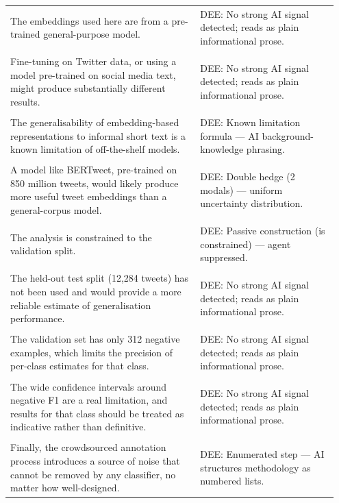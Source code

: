 \documentclass[11pt]{article}
\begin{document}
\begin{longtable}{|p{0.55\linewidth}|p{0.40\linewidth}|}
\hline
\rule{0pt}{3.5cm} & \\
\hline
The embeddings used here are from a pre-trained general-purpose model. & DEE: No strong AI signal detected; reads as plain informational prose. \\[2pt]
\hline
\rule{0pt}{3.5cm} & \\
\hline
Fine-tuning on Twitter data, or using a model pre-trained on social media text, might produce substantially different results. & DEE: No strong AI signal detected; reads as plain informational prose. \\[2pt]
\hline
\rule{0pt}{3.5cm} & \\
\hline
The generalisability of embedding-based representations to informal short text is a known limitation of off-the-shelf models. & DEE: Known limitation formula --- AI background-knowledge phrasing. \\[2pt]
\hline
\rule{0pt}{3.5cm} & \\
\hline
A model like BERTweet, pre-trained on 850 million tweets, would likely produce more useful tweet embeddings than a general-corpus model. & DEE: Double hedge (2 modals) --- uniform uncertainty distribution. \\[2pt]
\hline
\rule{0pt}{3.5cm} & \\
\hline
The analysis is constrained to the validation split. & DEE: Passive construction (is constrained) --- agent suppressed. \\[2pt]
\hline
\rule{0pt}{3.5cm} & \\
\hline
The held-out test split (12,284 tweets) has not been used and would provide a more reliable estimate of generalisation performance. & DEE: No strong AI signal detected; reads as plain informational prose. \\[2pt]
\hline
\rule{0pt}{3.5cm} & \\
\hline
The validation set has only 312 negative examples, which limits the precision of per-class estimates for that class. & DEE: No strong AI signal detected; reads as plain informational prose. \\[2pt]
\hline
\rule{0pt}{3.5cm} & \\
\hline
The wide confidence intervals around negative F1 are a real limitation, and results for that class should be treated as indicative rather than definitive. & DEE: No strong AI signal detected; reads as plain informational prose. \\[2pt]
\hline
\rule{0pt}{3.5cm} & \\
\hline
Finally, the crowdsourced annotation process introduces a source of noise that cannot be removed by any classifier, no matter how well-designed. & DEE: Enumerated step --- AI structures methodology as numbered lists. \\[2pt]

\end{longtable}
\end{document}
